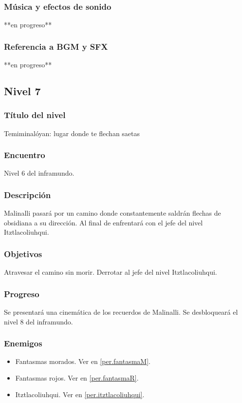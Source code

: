 \documentclass[11pt,letterpaper]{article}
\begin{document}
	\subsubsection{Música y efectos de sonido}
	**en progreso**
	\subsubsection{Referencia a BGM y SFX}
	**en progreso**
	
		\subsection{Nivel 7}
	\subsubsection{Título del nivel}
	Temiminalóyan: lugar donde te flechan saetas
	\subsubsection{Encuentro}
	Nivel 6 del inframundo.
	\subsubsection{Descripción}
	Malinalli pasará por un camino donde constantemente saldrán flechas de obsidiana a su dirección. Al final de enfrentará con el jefe del nivel Itztlacoliuhqui.
	\subsubsection{Objetivos}
	Atravesar el camino sin morir. Derrotar al jefe del nivel Itztlacoliuhqui.
	\subsubsection{Progreso}
	Se presentará una cinemática de los recuerdos de Malinalli. Se desbloqueará el nivel 8 del inframundo. 
	\subsubsection{Enemigos}
	\begin{itemize}
		\item Fantasmas morados. Ver en \ref{per.fantasmaM}.
		\item Fantasmas rojos. Ver en \ref{per.fantasmaR}.
		\item Itztlacoliuhqui. Ver en \ref{per.itztlacoliuhqui}.
	\end{itemize}
\end{document}
